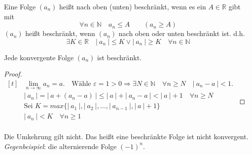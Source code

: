 \documentclass[a4paper,titlepage,oneside]{article}
\def\N{\ensuremath{\mathbb{N}} }
\def\R{\ensuremath{\mathbb{R}} }
\renewcommand{\epsilon}{\ensuremath{\varepsilon} }
\def\lor{\ensuremath{\vee}}
\renewcommand{\liminf}[2][n]{\ensuremath{\lim\limits_{#1 \rightarrow \infty}{#2}}}
\newcommand{\abs}[1]{\ensuremath{\left|\:#1\:\right|}}
\theoremstyle{thmstyle}
\begin{document}
\begin{subdefi}
Eine Folge \((a_n)\) heißt nach oben (unten) beschränkt, wenn es ein \(A \in \R\) gibt mit \[\forall n \in \N \quad a_n \le A \qquad (a_n \ge A)\]
\((a_n)\) heißt beschränkt, wenn \((a_n)\) nach oben oder unten beschränkt ist. d.h. \[\exists K \in \R \quad \abs{a_n} \le K \lor \abs{a_n} \ge K \quad \forall n \in \N \]
\end{subdefi}

\begin{subsatz}
Jede konvergente Folge \((a_n)\) ist beschränkt.
\begin{proof}
\begin{math} \displaystyle
\begin{aligned}[t]
	&\liminf{a_n} = a. \quad \text{Wähle } \epsilon = 1 > 0 \Rightarrow \exists N \in \N \quad \forall n \ge N \quad \abs{a_n - a} < 1. \\
	&\abs{a_n} = \abs{a + (a_n - a)} \le \abs{a} + \abs{a_n- a} < \abs{a} + 1 \quad \forall n \ge N \\
	&\text{Sei } K = max\{\abs{a_1}, \abs{a_2}, \dots, \abs{a_{n-1}}, \abs{a}+1\} \\
	&\abs{a_n} < K \quad \forall n \ge 1 \\
\end{aligned}
\end{math}
\end{proof}
\end{subsatz}

\begin{subbem}
Die Umkehrung gilt nicht. Das heißt eine beschränkte Folge ist nicht konvergent.\\
\textit{Gegenbeispiel}: die alternierende Folge $(-1)^n$.
\end{subbem}
\end{document}

